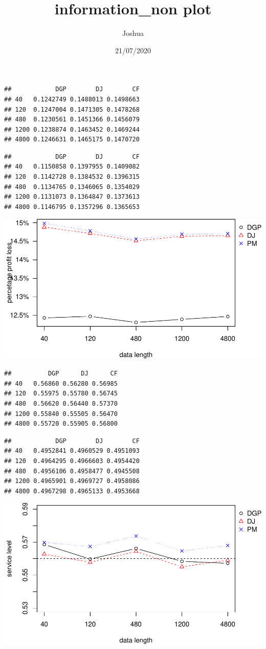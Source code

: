 \documentclass[
]{article}
\title{information\_non plot}
\author{Joshua}
\date{21/07/2020}
\begin{document}
\maketitle

\begin{verbatim}
##            DGP        DJ        CF
## 40   0.1242749 0.1488013 0.1498663
## 120  0.1247004 0.1471305 0.1478268
## 480  0.1230561 0.1451366 0.1456079
## 1200 0.1238874 0.1463452 0.1469244
## 4800 0.1246631 0.1465175 0.1470720
\end{verbatim}

\begin{verbatim}
##            DGP        DJ        CF
## 40   0.1150858 0.1397955 0.1409082
## 120  0.1142728 0.1384532 0.1396315
## 480  0.1134765 0.1346065 0.1354029
## 1200 0.1131073 0.1364847 0.1373613
## 4800 0.1146795 0.1357296 0.1365653
\end{verbatim}

\includegraphics{information_non-plot_files/figure-latex/AR(1)ppl-1.pdf}

\begin{verbatim}
##          DGP      DJ      CF
## 40   0.56860 0.56280 0.56985
## 120  0.55975 0.55780 0.56745
## 480  0.56620 0.56440 0.57370
## 1200 0.55840 0.55505 0.56470
## 4800 0.55720 0.55905 0.56800
\end{verbatim}

\begin{verbatim}
##            DGP        DJ        CF
## 40   0.4952841 0.4960529 0.4951093
## 120  0.4964295 0.4966603 0.4954420
## 480  0.4956106 0.4958477 0.4945508
## 1200 0.4965901 0.4969727 0.4958086
## 4800 0.4967298 0.4965133 0.4953668
\end{verbatim}

\includegraphics{information_non-plot_files/figure-latex/AR(1)sl-1.pdf}
\end{document}
